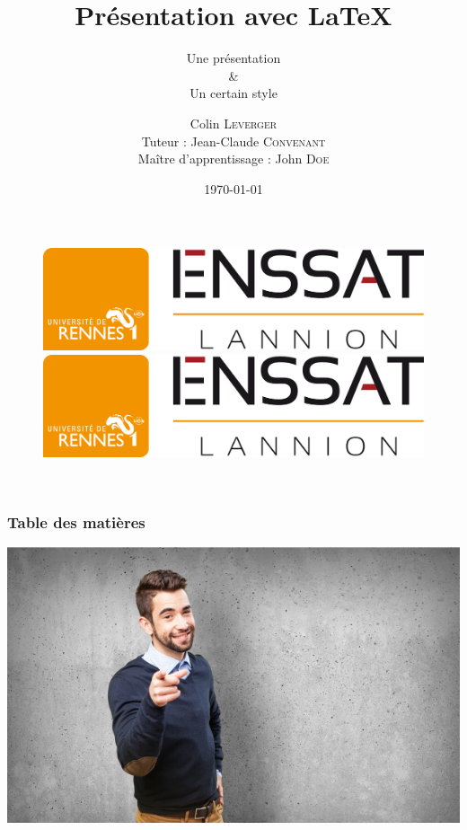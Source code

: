\documentclass{beamer}
\title{Présentation avec LaTeX}
\subtitle{Une présentation\\
      \&\\
      Un certain style}
\author[Colin \textsc{Leverger}]{Colin \textsc{Leverger}\\[0.2cm] \footnotesize Tuteur : Jean-Claude \textsc{Convenant}\\Maître d'apprentissage : John \textsc{Doe}}
\institute{ENSSAT Informatique, Multimédia et Réseaux \\
        \emph{Promotion 2017}}
\date{\today}
\begin{document}
{
\begin{frame}[plain]

\begin{figure}
  \begin{minipage}[c]{.46\linewidth}
    \includegraphics[scale=0.1]{images/logo_ecole.png}  %
  \end{minipage} \hfill
  \begin{minipage}[c]{.46\linewidth}
    \begin{flushright}
      \includegraphics[scale=0.1]{images/logo_ecole.png} %
    \end{flushright}
  \end{minipage} \\[0.5cm]
\end{figure}

\maketitle

\end{frame}
}
\begin{frame}
\frametitle{Table des matières}
\begin{minipage}[t]{0.4\textwidth}
 \vspace{0pt}
 \tableofcontents
\end{minipage}
\begin{minipage}[t]{0.35\textwidth}
 \vspace{0pt}
 \includegraphics[scale=0.3]{images/happy.jpg}
\end{minipage}
\end{frame}
\end{document}
